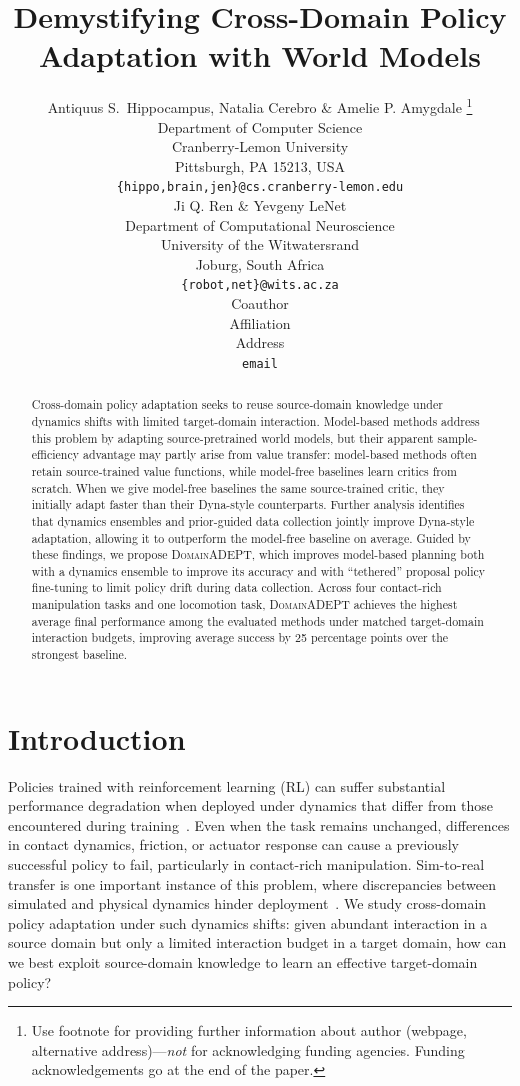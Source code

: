 \documentclass{article} %
\title{Demystifying Cross-Domain Policy Adaptation with World Models}
\author{Antiquus S.~Hippocampus, Natalia Cerebro \& Amelie P. Amygdale \thanks{ Use footnote for providing further information
about author (webpage, alternative address)---\emph{not} for acknowledging
funding agencies.  Funding acknowledgements go at the end of the paper.} \\
Department of Computer Science\\
Cranberry-Lemon University\\
Pittsburgh, PA 15213, USA \\
\texttt{\{hippo,brain,jen\}@cs.cranberry-lemon.edu} \\
\And
Ji Q. Ren \& Yevgeny LeNet \\
Department of Computational Neuroscience \\
University of the Witwatersrand \\
Joburg, South Africa \\
\texttt{\{robot,net\}@wits.ac.za} \\
\AND
Coauthor \\
Affiliation \\
Address \\
\texttt{email}
}
\newcommand{\DomainADEPT}{\textsc{DomainADEPT}\xspace}
\begin{document}
\maketitle

\begin{abstract}
Cross-domain policy adaptation seeks to reuse source-domain knowledge under dynamics shifts with limited target-domain interaction. Model-based methods address this problem by adapting source-pretrained world models, but their apparent sample-efficiency advantage may partly arise from value transfer: model-based methods often retain source-trained value functions, while model-free baselines learn critics from scratch. When we give model-free baselines the same source-trained critic, they initially adapt faster than their Dyna-style counterparts. Further analysis identifies that dynamics ensembles and prior-guided data collection jointly improve Dyna-style adaptation, allowing it to outperform the model-free baseline on average. Guided by these findings, we propose \DomainADEPT, which improves model-based planning both with a dynamics ensemble to improve its accuracy and with ``tethered'' proposal policy fine-tuning to limit policy drift during data collection. Across four contact-rich manipulation tasks and one locomotion task, \DomainADEPT achieves the highest average final performance among the evaluated methods under matched target-domain interaction budgets, improving average success by 25 percentage points over the strongest baseline.
\end{abstract}

\section{Introduction}
\label{intro}
Policies trained with reinforcement learning (RL) can suffer substantial performance degradation when deployed under dynamics that differ from those encountered during training~\citep{eysenbach2020off, liu2022dara}. Even when the task remains unchanged, differences in contact dynamics, friction, or actuator response can cause a previously successful policy to fail, particularly in contact-rich manipulation. Sim-to-real transfer is one important instance of this problem, where discrepancies between simulated and physical dynamics hinder deployment~\citep{tobin2017domain, peng2018sim, james2019sim, akkaya2019solving, andrychowicz2020learning}. We study cross-domain policy adaptation under such dynamics shifts: given abundant interaction in a source domain but only a limited interaction budget in a target domain, how can we best exploit source-domain knowledge to learn an effective target-domain policy?
\end{document}

